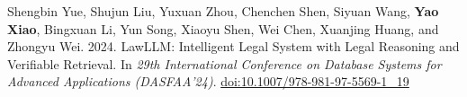 Shengbin Yue, Shujun Liu, Yuxuan Zhou, Chenchen Shen, Siyuan Wang, \textbf{Yao Xiao}, Bingxuan Li, Yun Song, Xiaoyu Shen, Wei Chen, Xuanjing Huang, and Zhongyu Wei. 2024. LawLLM: Intelligent Legal System with Legal Reasoning and Verifiable Retrieval. In \textit{29th International Conference on Database Systems for Advanced Applications (DASFAA'24)}. \href{https://doi.org/10.1007/978-981-97-5569-1_19}{doi:10.1007/978-981-97-5569-1\_19}
